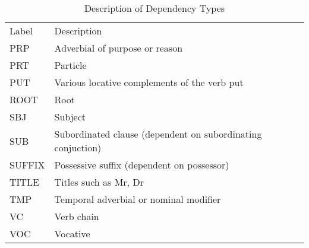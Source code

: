 \begin{table}[H]
\centering
    \begin{tabular}{@{}l p{12cm} @{}} \toprule
    Label&Description \\
PRP&  Adverbial of purpose or reason\\
PRT& Particle\\
PUT& Various locative complements of the verb put\\    
ROOT& Root\\
SBJ& Subject\\
SUB& Subordinated clause (dependent on subordinating conjuction)\\
SUFFIX& Possessive suffix (dependent on possessor)\\
TITLE& Titles such as Mr, Dr\\
TMP& Temporal adverbial or nominal modifier\\
VC& Verb chain\\
VOC& Vocative\\
 	\bottomrule 
    \end{tabular}  
\caption{Description of Dependency Types}\label{tab:dt}
\end{table}